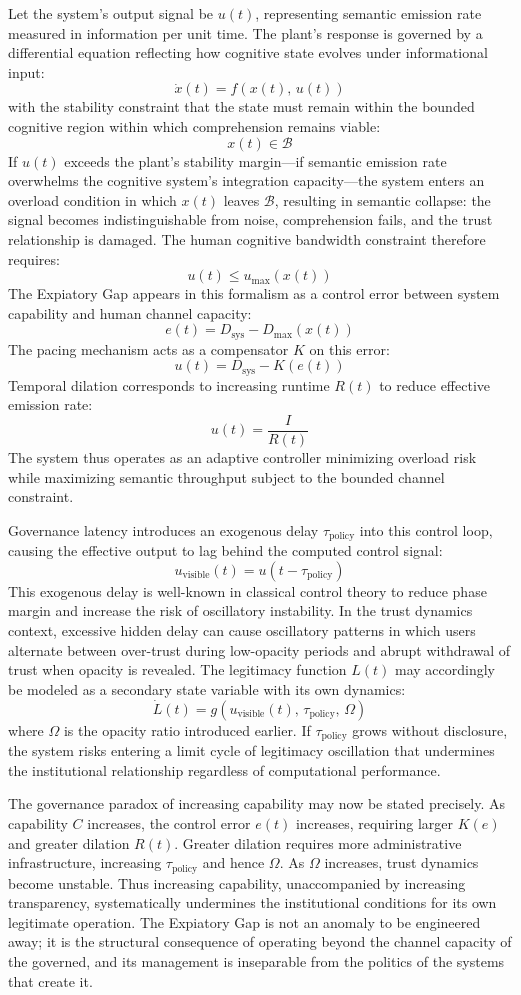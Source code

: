 \documentclass[12pt]{article}
\begin{document}
Let the system's output signal be $u(t)$, representing semantic emission rate measured in information per unit time. The plant's response is governed by a differential equation reflecting how cognitive state evolves under informational input:
\[
\dot{x}(t) = f(x(t),\, u(t))
\]
with the stability constraint that the state must remain within the bounded cognitive region within which comprehension remains viable:
\[
x(t) \in \mathcal{B}
\]
If $u(t)$ exceeds the plant's stability margin---if semantic emission rate overwhelms the cognitive system's integration capacity---the system enters an overload condition in which $x(t)$ leaves $\mathcal{B}$, resulting in semantic collapse: the signal becomes indistinguishable from noise, comprehension fails, and the trust relationship is damaged. The human cognitive bandwidth constraint therefore requires:
\[
u(t) \le u_{\max}(x(t))
\]
The Expiatory Gap appears in this formalism as a control error between system capability and human channel capacity:
\[
e(t) = D_{\text{sys}} - D_{\max}(x(t))
\]
The pacing mechanism acts as a compensator $K$ on this error:
\[
u(t) = D_{\text{sys}} - K(e(t))
\]
Temporal dilation corresponds to increasing runtime $R(t)$ to reduce effective emission rate:
\[
u(t) = \frac{I}{R(t)}
\]
The system thus operates as an adaptive controller minimizing overload risk while maximizing semantic throughput subject to the bounded channel constraint.

Governance latency introduces an exogenous delay $\tau_{\text{policy}}$ into this control loop, causing the effective output to lag behind the computed control signal:
\[
u_{\text{visible}}(t) = u(t - \tau_{\text{policy}})
\]
This exogenous delay is well-known in classical control theory to reduce phase margin and increase the risk of oscillatory instability. In the trust dynamics context, excessive hidden delay can cause oscillatory patterns in which users alternate between over-trust during low-opacity periods and abrupt withdrawal of trust when opacity is revealed. The legitimacy function $L(t)$ may accordingly be modeled as a secondary state variable with its own dynamics:
\[
\dot{L}(t) = g(u_{\text{visible}}(t),\, \tau_{\text{policy}},\, \Omega)
\]
where $\Omega$ is the opacity ratio introduced earlier. If $\tau_{\text{policy}}$ grows without disclosure, the system risks entering a limit cycle of legitimacy oscillation that undermines the institutional relationship regardless of computational performance.

The governance paradox of increasing capability may now be stated precisely. As capability $C$ increases, the control error $e(t)$ increases, requiring larger $K(e)$ and greater dilation $R(t)$. Greater dilation requires more administrative infrastructure, increasing $\tau_{\text{policy}}$ and hence $\Omega$. As $\Omega$ increases, trust dynamics become unstable. Thus increasing capability, unaccompanied by increasing transparency, systematically undermines the institutional conditions for its own legitimate operation. The Expiatory Gap is not an anomaly to be engineered away; it is the structural consequence of operating beyond the channel capacity of the governed, and its management is inseparable from the politics of the systems that create it.
\end{document}
